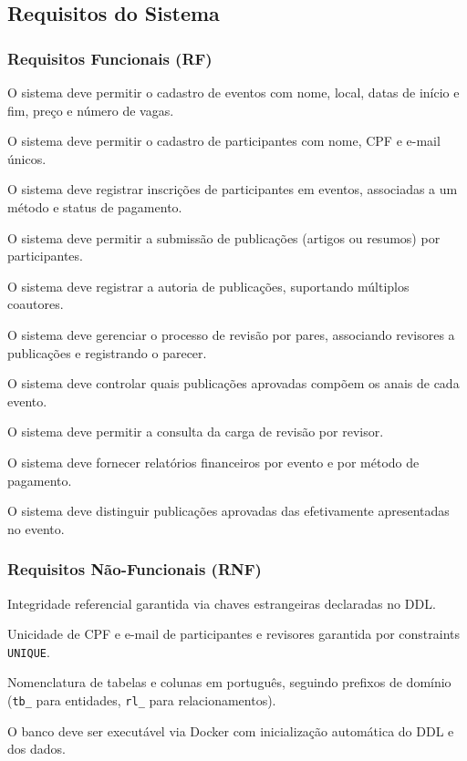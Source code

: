 \documentclass[12pt,a4paper]{article}
\begin{document}
\subsection{Requisitos do Sistema}
\label{subsec:requisitos}

\subsubsection{Requisitos Funcionais (RF)}
\begin{description}[leftmargin=2.5cm,style=nextline]
    \item[\textbf{RF01}] O sistema deve permitir o cadastro de eventos com nome, local, datas de início e fim, preço e número de vagas.
    \item[\textbf{RF02}] O sistema deve permitir o cadastro de participantes com nome, CPF e e-mail únicos.
    \item[\textbf{RF03}] O sistema deve registrar inscrições de participantes em eventos, associadas a um método e status de pagamento.
    \item[\textbf{RF04}] O sistema deve permitir a submissão de publicações (artigos ou resumos) por participantes.
    \item[\textbf{RF05}] O sistema deve registrar a autoria de publicações, suportando múltiplos coautores.
    \item[\textbf{RF06}] O sistema deve gerenciar o processo de revisão por pares, associando revisores a publicações e registrando o parecer.
    \item[\textbf{RF07}] O sistema deve controlar quais publicações aprovadas compõem os anais de cada evento.
    \item[\textbf{RF08}] O sistema deve permitir a consulta da carga de revisão por revisor.
    \item[\textbf{RF09}] O sistema deve fornecer relatórios financeiros por evento e por método de pagamento.
    \item[\textbf{RF10}] O sistema deve distinguir publicações aprovadas das efetivamente apresentadas no evento.
\end{description}

\subsubsection{Requisitos Não-Funcionais (RNF)}
\begin{description}[leftmargin=2.5cm,style=nextline]
    \item[\textbf{RNF01}] Integridade referencial garantida via chaves estrangeiras declaradas no DDL.
    \item[\textbf{RNF02}] Unicidade de CPF e e-mail de participantes e revisores garantida por constraints \texttt{UNIQUE}.
    \item[\textbf{RNF03}] Nomenclatura de tabelas e colunas em português, seguindo prefixos de domínio (\texttt{tb\_} para entidades, \texttt{rl\_} para relacionamentos).
    \item[\textbf{RNF04}] O banco deve ser executável via Docker com inicialização automática do DDL e dos dados.
\end{description}
\end{document}
